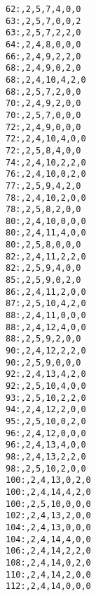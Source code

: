 \documentclass[10pt, letterpaper]{article}
\begin{document}
\begin{verbatim}
62:,2,5,7,4,0,0
63:,2,5,7,0,0,2
63:,2,5,7,2,2,0
64:,2,4,8,0,0,0
66:,2,4,9,2,2,0
68:,2,4,9,0,2,0
68:,2,4,10,4,2,0
68:,2,5,7,2,0,0
70:,2,4,9,2,0,0
70:,2,5,7,0,0,0
72:,2,4,9,0,0,0
72:,2,4,10,4,0,0
72:,2,5,8,4,0,0
74:,2,4,10,2,2,0
76:,2,4,10,0,2,0
77:,2,5,9,4,2,0
78:,2,4,10,2,0,0
78:,2,5,8,2,0,0
80:,2,4,10,0,0,0
80:,2,4,11,4,0,0
80:,2,5,8,0,0,0
82:,2,4,11,2,2,0
82:,2,5,9,4,0,0
85:,2,5,9,0,2,0
86:,2,4,11,2,0,0
87:,2,5,10,4,2,0
88:,2,4,11,0,0,0
88:,2,4,12,4,0,0
88:,2,5,9,2,0,0
90:,2,4,12,2,2,0
90:,2,5,9,0,0,0
92:,2,4,13,4,2,0
92:,2,5,10,4,0,0
93:,2,5,10,2,2,0
94:,2,4,12,2,0,0
95:,2,5,10,0,2,0
96:,2,4,12,0,0,0
96:,2,4,13,4,0,0
98:,2,4,13,2,2,0
98:,2,5,10,2,0,0
100:,2,4,13,0,2,0
100:,2,4,14,4,2,0
100:,2,5,10,0,0,0
102:,2,4,13,2,0,0
104:,2,4,13,0,0,0
104:,2,4,14,4,0,0
106:,2,4,14,2,2,0
108:,2,4,14,0,2,0
110:,2,4,14,2,0,0
112:,2,4,14,0,0,0
\end{verbatim}
\end{document}
